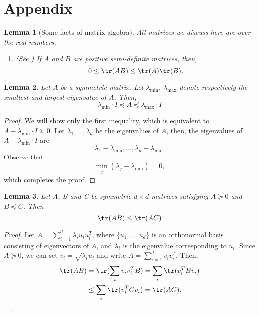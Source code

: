 \documentclass[nobib]{my-handout}
\newtheorem{lemma}{Lemma}
\begin{document}
\section{Appendix}

\begin{lemma}[Some facts of matrix algebra]
	All matrices we discuss here are over the real numbers.
	\begin{enumerate}
		\item (See \cite{ulukok_matrix_2010}) If $A$ and $B$ are positive
			semi-definite matrices, then, \[ 0 \le \tr(AB) \le \tr(A) \tr(B). \] 
	\end{enumerate}
\end{lemma}

\begin{lemma}
	Let $A$ be a symmetric matrix. Let $\lambda_{\min}$, $\lambda_{\max}$
	denote respectively the smallest and largest eigenvalue of $A$. Then,
	\[ \lambda_{\min} \cdot I \preceq A \preceq \lambda_{\max} \cdot I \]
\end{lemma}

\begin{proof}
	We will show only the first inequality, which is equivalent to $A -
	\lambda_{\min} \cdot I \succeq 0$. Let $\lambda_1, \dotsc, \lambda_d$ be the
	eigenvalues of $A$, then, the eigenvalues of $A - \lambda_{\min} \cdot I$ are
	\[ {\lambda_1 - \lambda_{\min}, \dotsc, \lambda_d - \lambda_{\min}}. \]
	Observe that
	\[ \min_j(\lambda_j - \lambda_{\min}) = 0, \]
	which completes the proof.
\end{proof}

\begin{lemma}\label{lemma:tr_AB_le_AC}
	Let A, B and C be symmetric $d \times d$ matrices satisfying $A \succeq 0$
	and $B \preceq C$. Then
	\[ \tr(AB) \le \tr(AC) \]
\end{lemma}

\begin{proof}
	Let $A = \sum_{i=1}^d \lambda_i u_i u_i^T$, where $\{u_1, \dotsc, u_d\}$ is an
	orthonormal basis consisting of eigenvectors of $A$, and $\lambda_i$ is the
	eigenvalue corresponding to $u_i$. Since $A \succeq 0$, we can set $v_i =
	\sqrt{\lambda_i} u_i$ and write $A = \sum_{i=1}^d v_i v_i^T$. Then,
	\begin{equation*}
		\begin{aligned}
			\tr(AB) &= \tr(\sum_i v_i v_i^T B) = \sum_i \tr(v_i^T B v_i) \\
							&\le \sum_i \tr(v_i^T C v_i) = \tr(AC).
		\end{aligned}
	\end{equation*}
\end{proof}
\end{document}
